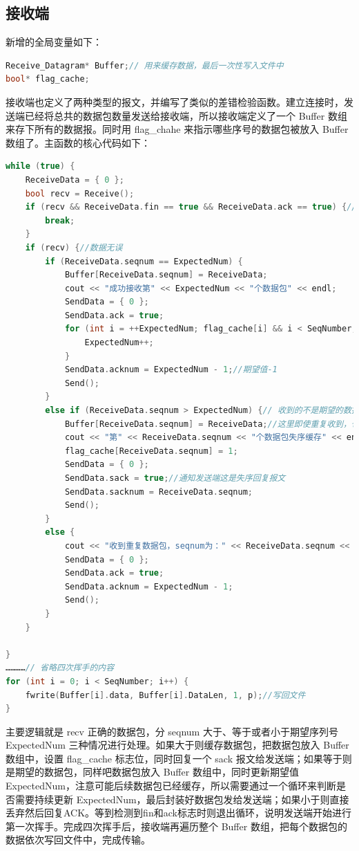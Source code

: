 \documentclass[UTF8,a4paper,10pt]{ctexart}
\begin{document}
\subsection{接收端}
新增的全局变量如下：
\begin{lstlisting}[frame=trbl,language={C++}]
Receive_Datagram* Buffer;// 用来缓存数据，最后一次性写入文件中
bool* flag_cache;
\end{lstlisting}\par
接收端也定义了两种类型的报文，并编写了类似的差错检验函数。建立连接时，发送端已经将总共的数据包数量发送给接收端，所以接收端定义了一个 Buffer 数组来存下所有的数据报。同时用 flag\_chahe 来指示哪些序号的数据包被放入 Buffer 数组了。主函数的核心代码如下：
\begin{lstlisting}[frame=trbl,language={C++}]
while (true) {
    ReceiveData = { 0 };
    bool recv = Receive();
    if (recv && ReceiveData.fin == true && ReceiveData.ack == true) {// 第一次挥手
        break;
    }
    if (recv) {//数据无误
        if (ReceiveData.seqnum == ExpectedNum) {
            Buffer[ReceiveData.seqnum] = ReceiveData;
            cout << "成功接收第" << ExpectedNum << "个数据包" << endl;
            SendData = { 0 };
            SendData.ack = true;
            for (int i = ++ExpectedNum; flag_cache[i] && i < SeqNumber; i++) {// 有可能刚好填补上空缺的一块，这里需要连续增加ExpectedNum
                ExpectedNum++;
            }
            SendData.acknum = ExpectedNum - 1;//期望值-1
            Send();
        }
        else if (ReceiveData.seqnum > ExpectedNum) {// 收到的不是期望的数据包，缓存并回复ACK
            Buffer[ReceiveData.seqnum] = ReceiveData;//这里即使重复收到，也不需要判断，直接覆盖即可
            cout << "第" << ReceiveData.seqnum << "个数据包失序缓存" << endl;
            flag_cache[ReceiveData.seqnum] = 1;
            SendData = { 0 };
            SendData.sack = true;//通知发送端这是失序回复报文
            SendData.sacknum = ReceiveData.seqnum;
            Send();
        }
        else {
            cout << "收到重复数据包，seqnum为：" << ReceiveData.seqnum << endl;
            SendData = { 0 };
            SendData.ack = true;
            SendData.acknum = ExpectedNum - 1;
            Send();
        }
    }

}
…………// 省略四次挥手的内容
for (int i = 0; i < SeqNumber; i++) {
    fwrite(Buffer[i].data, Buffer[i].DataLen, 1, p);//写回文件
}
\end{lstlisting}\par
主要逻辑就是 recv 正确的数据包，分 seqnum 大于、等于或者小于期望序列号 ExpectedNum 三种情况进行处理。如果大于则缓存数据包，把数据包放入 Buffer 数组中，设置 flag\_cache 标志位，同时回复一个 sack 报文给发送端；如果等于则是期望的数据包，同样吧数据包放入 Buffer 数组中，同时更新期望值 ExpectedNum，注意可能后续数据包已经缓存，所以需要通过一个循环来判断是否需要持续更新 ExpectedNum，最后封装好数据包发给发送端；如果小于则直接丢弃然后回复ACK。等到检测到fin和ack标志时则退出循环，说明发送端开始进行第一次挥手。完成四次挥手后，接收端再遍历整个 Buffer 数组，把每个数据包的数据依次写回文件中，完成传输。
 
\end{document}
